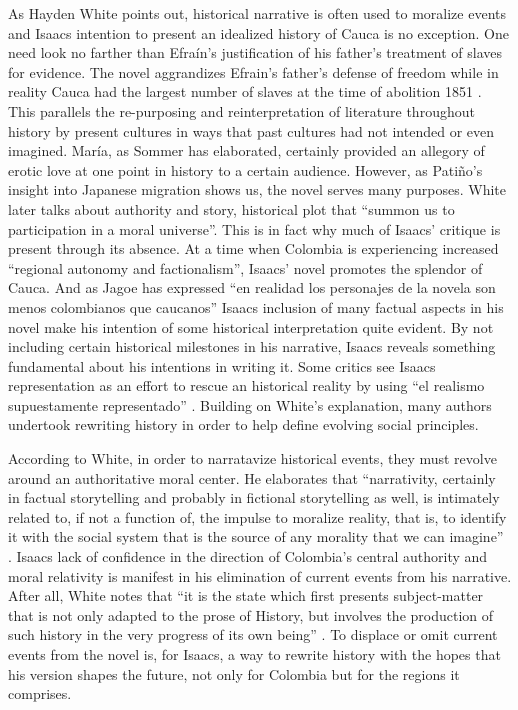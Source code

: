 As Hayden White points out, historical narrative is often used to moralize events and Isaacs intention to present an idealized history of Cauca is no exception.
One need look no farther than Efraín's justification of his father's treatment of slaves for evidence.
The novel aggrandizes Efrain’s father’s defense of freedom while in reality Cauca had the largest number of slaves at the time of abolition 1851 \autocite[351]{Palacios2002}.
This parallels the re-purposing and reinterpretation of literature throughout history by present cultures in ways that past cultures had not intended or even imagined. 
María, as Sommer has elaborated, certainly provided an allegory of erotic love at one point in history to a certain audience. 
However, as Patiño's insight into Japanese migration shows us, the novel serves many purposes.
White later talks about authority and story, historical plot that \enquote{summon us to participation in a moral universe}. 
This is in fact why much of Isaacs' critique is present through its absence. 
At a time when Colombia is experiencing increased \enquote{regional autonomy and factionalism}, Isaacs' novel promotes the splendor of Cauca.
And as Jagoe has expressed \enquote{en realidad los personajes de la novela son menos colombianos que caucanos} \autocite[149]{Jagoe2003} 
Isaacs inclusion of many factual aspects in his novel make his intention of some historical interpretation quite evident. 
By not including certain historical milestones in his narrative, Isaacs reveals something fundamental about his intentions in writing it. 
Some critics see Isaacs representation as an effort to rescue an historical reality by using \enquote{el realismo supuestamente representado} \autocite[367]{Ortiz2007}. 
Building on White’s explanation, many authors undertook rewriting history in order to help define evolving social principles.  


According to White, in order to narratavize historical events, they must revolve around an authoritative moral center. 
He elaborates that \enquote{narrativity, certainly in factual storytelling and probably in fictional storytelling as well, is intimately related to, if not a function of, the impulse to moralize reality, that is, to identify it with the social system that is the source of any morality that we can imagine} \autocite[18]{White1980}. 
Isaacs lack of confidence in the direction of Colombia’s central authority and moral relativity is manifest in his elimination of current events from his narrative.
After all, White notes that \enquote{it is the state which first presents subject-matter that is not only adapted to the prose of History, but involves the production of such history in the very progress of its own being} \autocite[18]{White1980}.
To displace or omit current events from the novel is, for Isaacs, a way to rewrite history with the hopes that his version shapes the future, not only for Colombia but for the regions it comprises.


